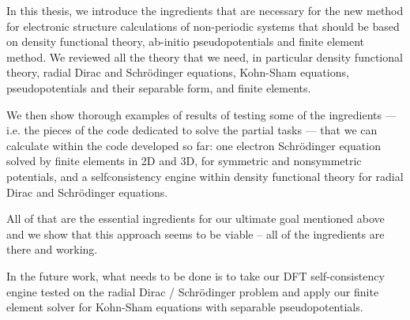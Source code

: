 In this thesis, we introduce the ingredients that are necessary for the new
method for electronic structure calculations of non-periodic systems that
should be based on density functional theory, ab-initio pseudopotentials and
finite element method. We reviewed all the theory that we need, in particular
density functional theory, radial Dirac and Schr\"odinger equations, Kohn-Sham
equations, pseudopotentials and their separable form, and finite elements.

We then show thorough examples of results of testing some of the ingredients
--- i.e. the pieces of the code dedicated to solve the partial tasks --- that
we can calculate within the code developed so far: one electron Schr\"odinger
equation solved by finite elements in 2D and 3D, for symmetric and nonsymmetric
potentials, and a selfconsistency engine within density functional theory for
radial Dirac and Schr\"odinger equations.

All of that are the essential ingredients for our ultimate goal mentioned above
and we show that this approach seems to be viable -- all of the ingredients are
there and working.

In the future work, what needs to be done is to take our DFT self-consistency
engine tested on the radial Dirac / Schr\"odinger problem and apply our finite
element solver for Kohn-Sham equations with separable pseudopotentials.
